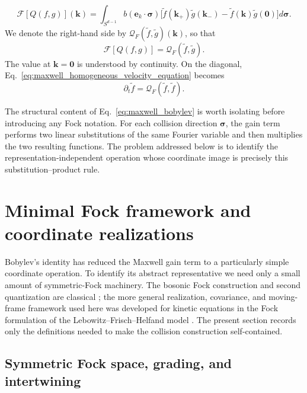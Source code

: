 \documentclass[11pt,oneside]{article}
\numberwithin{equation}{section}
\theoremstyle{definition}
\begin{document}
\begin{equation}
\boxed{
\mathcal F[Q(f,g)](\bm k)
=
\int_{S^{d-1}}
 b(\bm e_k\!\cdot\!\bm\sigma)
 \Big[
 \widetilde f(\bm k_+)\widetilde g(\bm k_-)
 -\widetilde f(\bm k)\widetilde g(\bm0)
 \Big]d\bm\sigma .
}
\label{eq:maxwell_bobylev}
\end{equation}
We denote the right-hand side by $\mathcal Q_F(\widetilde f,\widetilde g)(\bm k)$, so that
\begin{equation}
\mathcal F[Q(f,g)]
=
\mathcal Q_F(\widetilde f,\widetilde g).
\label{eq:maxwell_bobylev_operator_identity}
\end{equation}
The value at $\bm k=\bm0$ is understood by continuity.  On the diagonal, Eq.~\eqref{eq:maxwell_homogeneous_velocity_equation} becomes
\begin{equation}
\partial_t\widetilde f
=
\mathcal Q_F(\widetilde f,\widetilde f).
\label{eq:maxwell_bobylev_diagonal_evolution}
\end{equation}

The structural content of Eq.~\eqref{eq:maxwell_bobylev} is worth isolating before introducing any Fock notation.  For each collision direction $\bm\sigma$, the gain term performs two linear substitutions of the same Fourier variable and then multiplies the two resulting functions.  The problem addressed below is to identify the representation-independent operation whose coordinate image is precisely this substitution--product rule.

\section{Minimal Fock framework and coordinate realizations}
\label{sec:maxwell_fock}

Bobylev's identity has reduced the Maxwell gain term to a particularly simple coordinate operation.  To identify its abstract representative we need only a small amount of symmetric-Fock machinery.  The bosonic Fock construction and second quantization are classical \cite{Fock1932,Berezin1966,Hall2013}; the more general realization, covariance, and moving-frame framework used here was developed for kinetic equations in the Fock formulation of the Lebowitz--Frisch--Helfand model \cite{Karlin2026LFHFock}.  The present section records only the definitions needed to make the collision construction self-contained.

\subsection{Symmetric Fock space, grading, and intertwining}
\label{subsec:maxwell_fock_framework}
\end{document}
